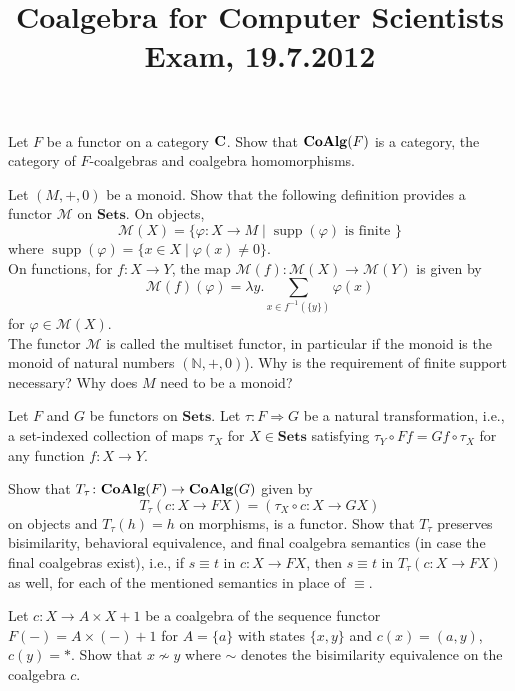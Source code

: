 \documentclass{article}
\newcommand{\Sets}{\mathbf{Sets}}
\newcommand{\after}{\mathrel{\circ}}
\DeclareMathOperator{\supp}{supp}
\begin{document}
\title{Coalgebra for Computer Scientists\\
  {\small{\bf{Exam, 19.7.2012}}}}
\date{}

\maketitle

\vspace*{-1cm}


\quad 
Let $F$ be a functor on a category $\bf C$. Show that ${\bf{CoAlg}}(F)$ is a category, the category of $F$-coalgebras and coalgebra homomorphisms.
\vspace*{3mm}




\quad 
Let $(M, +, 0)$ be a monoid. Show that the following definition provides a functor $\mathcal M$ on $\Sets$.
On objects,
$$\mathcal M(X) = \{ \varphi\colon X \to M \mid \supp(\varphi) \text{~is~finite~}\}$$
where $\supp(\varphi) = \{ x \in X \mid \varphi(x) \neq 0\}$.\\

\noindent On functions, for $f\colon X \to Y$, the map $\mathcal M(f) \colon \mathcal M(X) \to \mathcal M(Y)$ is given by
$$\mathcal M (f)(\varphi) = \lambda y. \sum_{x \in f^{-1}(\{y\})} \varphi(x)$$ 
for $\varphi \in \mathcal M(X)$.\\

\noindent The functor $\mathcal M$ is called the multiset functor, in particular if the monoid is the monoid of natural numbers $(\mathbb N, + ,0)$). Why is the requirement of finite support necessary? Why does $M$ need to be a monoid? 

\vspace*{3mm}

\quad 
Let $F$ and $G$ be functors on $\Sets$. Let $\tau\colon F \Rightarrow G$ be a natural transformation, i.e., a set-indexed collection of maps $\tau_X$ for $X \in \Sets$ satisfying $\tau_Y \after Ff = Gf \after \tau_X$ for any function $f\colon X \to Y$. 

\noindent Show that $T_\tau\colon {\bf CoAlg}(F) \to {\bf CoAlg}(G)$ given by
$$T_\tau(c\colon X \to FX) = (\tau_X \after c \colon X \to GX)$$
on objects and $T_\tau(h) = h$ 
on morphisms, is a functor. Show that $T_\tau$ preserves bisimilarity, behavioral equivalence, and final coalgebra semantics (in case the final coalgebras exist), i.e., if $s \equiv t$ in $c\colon X \to FX$, then $s \equiv t$ in $T_\tau(c\colon X \to FX)$ as well, for each of the mentioned semantics in place of $\equiv$.

\vspace*{3mm}

\quad
Let $c\colon X \to A \times X + 1$ be a coalgebra of the sequence functor $F(-) = A \times (-) + 1$ for $A = \{a\}$ with 
states $\{x,y\}$ and $c(x) = (a,y)$, $c(y) = *$. 
Show that $x \not\sim y$ where $\sim$ denotes the bisimilarity equivalence on the coalgebra $c$.

\vspace*{3mm}
\end{document}
